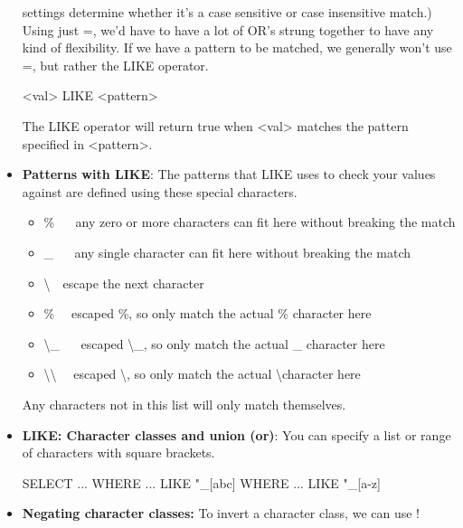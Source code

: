\documentclass{report}
\begin{document}
\begin{itemize}
            settings determine whether it's a case sensitive or case insensitive match.)
            \bigbreak \noindent 
            Using just =, we'd have to have a lot of OR's strung together to have any kind of flexibility.
            \bigbreak \noindent 
            If we have a pattern to be matched, we generally won't use =, but rather the LIKE operator.
            \bigbreak \noindent 
            \begin{sqlcode}
                <val> LIKE <pattern>
            \end{sqlcode}
            The LIKE operator will return true when <val> matches the pattern specified in <pattern>.
        \item \textbf{Patterns with LIKE}: The patterns that LIKE uses to check your values against are defined using these special characters. 
            \begin{itemize}
                \item \% $\quad$ any zero or more characters can fit here without breaking the match
                \item \_ $\quad$ any single character can fit here without breaking the match
                \item \textbackslash $\quad$escape the next character
                \item \% $\quad$escaped \%, so only match the actual \% character here
                \item \textbackslash\_ $\quad$ escaped \textbackslash\_, so only match the actual \_ character here
                \item \textbackslash\textbackslash $\quad $ escaped \textbackslash, so only match the actual \textbackslash character here
            \end{itemize}
            \bigbreak \noindent 
            Any characters not in this list will only match themselves.
            \bigbreak \noindent 
        \item \textbf{LIKE: Character classes and union (or)}: You can specify a list or range of characters with square brackets.
            \bigbreak \noindent 
            \begin{sqlcode}
            SELECT ...
                WHERE ... LIKE "_[abc]%
                WHERE ... LIKE "_[a-z]%
            \end{sqlcode}
        \item \textbf{Negating character classes:} To invert a character class, we can use !
            \bigbreak \noindent 
            \begin{sqlcode}

\end{sqlcode}
\end{itemize}
\end{document}
